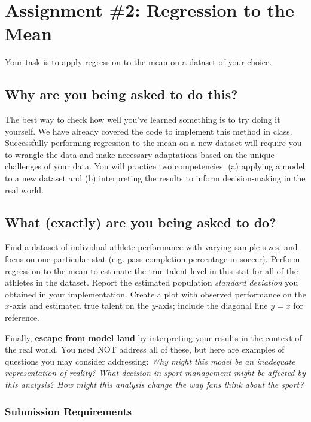 \documentclass{article}
\begin{document}
  \section*{\sc Assignment \#2: Regression to the Mean}

    Your task is to apply regression to the mean on a dataset of your choice.
  
    \subsection*{\sc Why are you being asked to do this?}

      The best way to check how well you've learned something is to try doing it yourself. We have already covered the code to implement this method in class. Successfully performing regression to the mean on a new dataset will require you to wrangle the data and make necessary adaptations based on the unique challenges of your data. You will practice two competencies: (a) applying a model to a new dataset and (b) interpreting the results to inform decision-making in the real world.
    
    \subsection*{\sc What (exactly) are you being asked to do?}

      Find a dataset of individual athlete performance with varying sample sizes, and focus on one particular stat (e.g. pass completion percentage in soccer). Perform regression to the mean to estimate the true talent level in this stat for all of the athletes in the dataset. Report the estimated population {\it standard deviation} you obtained in your implementation. Create a plot with observed performance on the $x$-axis and estimated true talent on the $y$-axis; include the diagonal line $y = x$ for reference.

      Finally, {\bf escape from model land} by interpreting your results in the context of the real world. You need NOT address all of these, but here are examples of questions you may consider addressing: {\it Why might this model be an inadequate representation of reality? What decision in sport management might be affected by this analysis? How might this analysis change the way fans think about the sport?}

      \subsubsection*{\sc Submission Requirements}
\end{document}
